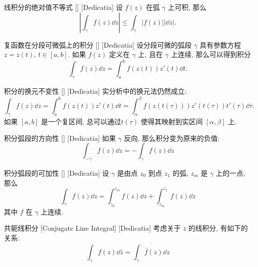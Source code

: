         \begin{ppt}
            {线积分的绝对值不等式}
            []
            [Dedicatia]
            设 \(f(z)\) 在弧 \(\gamma\) 上可积, 那么
            \[\left|\int_\gamma f(z)\dd{z}\right|\leq \int_\gamma |f(z)||\dd{z}|.\]
        \end{ppt}

        \begin{crl}
            {复函数在分段可微弧上的积分}
            []
            [Dedicatia]
            设分段可微的弧段 \(\gamma\) 具有参数方程 \(z=z(t)\),  \(t\in[a,b]\). 如果 \(f(z)\) 定义在 \(\gamma\) 上, 且在 \(\gamma\) 上连续, 那么可以得到积分
            \[\int_\gamma f(z)\dd{z}=\int_{a}^{b}f(z(t))z'(t)\dd{t}.\]
        \end{crl}

        \begin{ppt}
            {积分的换元不变性}
            []
            [Dedicatia]
            实分析中的换元法仍然成立: 
            \[\int_\gamma f(z)\dd{z}=\int_{a}^{b}f(z(t))z'(t)\dd{t}=\int_{\alpha}^{\beta}f(z(t(\tau)))z'(t(\tau))t'(\tau)\dd{\tau}.\]
            如果 \([a,b]\) 是一个复区间, 总可以通过\ConformalMapping  \(t(\tau)\) 使得其映射到实区间 \([\alpha,\beta]\) 上. 
        \end{ppt}

        \begin{ppt}
            {积分弧段的方向性}
            []
            [Dedicatia]
            如果 \(\gamma\) 反向, 那么积分变为原来的负值: 
            \[\int_{-\gamma} f(z)\dd{z}=-\int_\gamma f(z)\dd{z}\]
        \end{ppt}

        \begin{ppt}
            {积分弧段的可加性}
            []
            [Dedicatia]
            设 \(\gamma\) 是由点 \(z_0\) 到点 \(z_1\) 的弧,  \(z_m\) 是 \(\gamma\) 上的一点, 那么
            \[\int_\gamma f(z)\dd{z}=\int_{z_0}^{z_m} f(z)\dd{z}+\int_{z_m}^{z_1} f(z)\dd{z}\]
            其中 \(f\) 在 \(\gamma\) 上连续.
        \end{ppt}

        \begin{ppt}
            {共轭线积分}
            [Conjugate Line Integral]
            [Dedicatia]
            考虑关于 \(\bar{z}\) 的线积分, 有如下的关系:
            \[\int_\gamma f(z)\dd{\bar{z}}=\overline{\int_\gamma \bar{f}(z)\dd{z}}\]
        \end{ppt}
        
